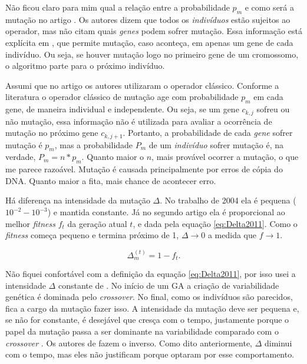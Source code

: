 		
	Não ficou claro para mim qual a relação entre a probabilidade $p_m$ e como será a mutação no artigo \cite{metodo2004}. Os autores dizem que todos os \emph{indivíduos} estão sujeitos ao operador, mas não citam quais \emph{genes} podem sofrer mutação. Essa informação está explícita em \cite{metodo2011}, que permite mutação, caso aconteça, em apenas um gene de cada indivíduo. Ou seja, se houver mutação logo no primeiro gene de um cromossomo, o algoritmo parte para o próximo indivíduo.
	
	Assumi que no artigo \cite{metodo2004} os autores utilizaram o operador clássico. Conforme a literatura \cite{Mitchell98, Linden2008} o operador clássico de mutação age com probabilidade $p_m$ em cada gene, de maneira individual e independente. Ou seja, se um gene $c_{k,j}$ sofreu ou não mutação, essa informação não é utilizada para avaliar a ocorrência de mutação no próximo gene $c_{k,j+1}$. Portanto, a probabilidade de cada \emph{gene} sofrer mutação é $p_m$, mas a probabilidade $P_m$ de um \emph{indivíduo} sofrer mutação é, na verdade, $P_m = n*p_m$. Quanto maior o $n$, mais provável ocorrer a mutação, o que me parece razoável. Mutação é causada principalmente por erros de cópia do DNA. Quanto maior a fita, mais chance de acontecer erro.

	Há diferença na intensidade da mutação $\Delta$. No trabalho de 2004 ela é pequena ($10^{-2}-10^{-3}$) e mantida constante. Já no segundo artigo ela é proporcional ao melhor \emph{fitness} $f_t$ da geração atual $t$, e dada pela equação \ref{eq:Delta2011}. Como o \emph{fitness} começa pequeno e termina próximo de 1, $\Delta \rightarrow 0$ a medida que $f \rightarrow 1$.

\begin{equation}\label{eq:Delta2011}
	\Delta^{(t)}_m =  1 - f_t.
\end{equation}	

	Não fiquei confortável com a definição da equação \ref{eq:Delta2011}, por isso usei a intensidade $\Delta$ constante de \cite{metodo2004}. No início de um GA a criação de variabilidade genética é dominada pelo \emph{crossover}. No final, como os indivíduos são parecidos, fica a cargo da mutação fazer isso. A intensidade da mutação deve ser pequena e, se não for constante, é desejável que cresça com o tempo, justamente porque o papel da mutação passa a ser dominante na variabilidade comparado com o \emph{crossover} \cite{Linden2008}. Os autores de \cite{metodo2011} fazem o inverso. Como dito anteriormente, $\Delta$ diminui com o tempo, mas eles não justificam porque optaram por esse comportamento.
	
